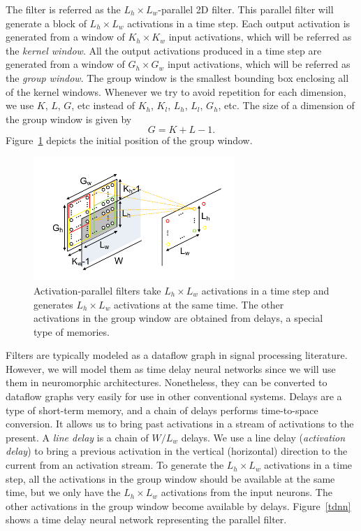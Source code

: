 \documentclass[journal]{IEEEtran}
\begin{document}
The filter is referred as the $L_h\times L_w$-parallel 2D filter. This parallel filter will generate a block of $L_h \times L_w$ activations in a time step.  %
Each output activation is generated from a window of $K_h\times K_w$ input activations, which will be referred as the \textit{kernel window}.  All the output activations produced in a time step are generated from a window of $G_h \times G_w$ input activations, which will be referred as the \textit{group window}.  The group window is the smallest bounding box enclosing all of the kernel windows. Whenever we try to avoid repetition for each dimension, we use $K$, $L$, $G$, etc instead of $K_h$, $K_l$, $L_h$, $L_l$, $G_h$, etc. 
The size of a dimension of the group window is given by
\begin{equation}
	G = K + L-1.
\end{equation}
Figure~\ref{groupwindow} depicts the initial position of the group window. 
\begin{figure}[h]
\centering
\vspace{-0.2in}
\includegraphics[width = 3in]{./FIGURES/fig3.pdf}
\vspace{-0.1in}
\caption {Activation-parallel filters take $L_h\times L_w$ activations in a time step and generates $L_h\times L_w$ activations at the same time. The other activations in the group window are obtained from delays, a special type of memories.} \label{groupwindow}
\end{figure} 
Filters are typically modeled as a dataflow graph in signal processing literature. However, we will model them as time delay neural networks since we will use them in neuromorphic architectures. Nonetheless, they can be converted to dataflow graphs very easily for use in other conventional systems. Delays are a type of short-term memory, and a chain of delays performs time-to-space conversion. It allows us to bring past activations in a stream of activations to the present. A \textit{line delay} is a chain of $W/L_w$ delays. We use a line delay (\textit{activation delay}) to bring a previous activation in the vertical (horizontal) direction to the current from an activation stream.   To generate the $L_h \times L_w$ activations in a time step, all the activations in the group window should be available at the same time, but we only have the $L_h\times L_w$ activations from the input neurons. The other activations in the group window become available by delays. Figure~\ref{tdnn} shows  a time delay neural network representing the parallel filter.
\end{document}
